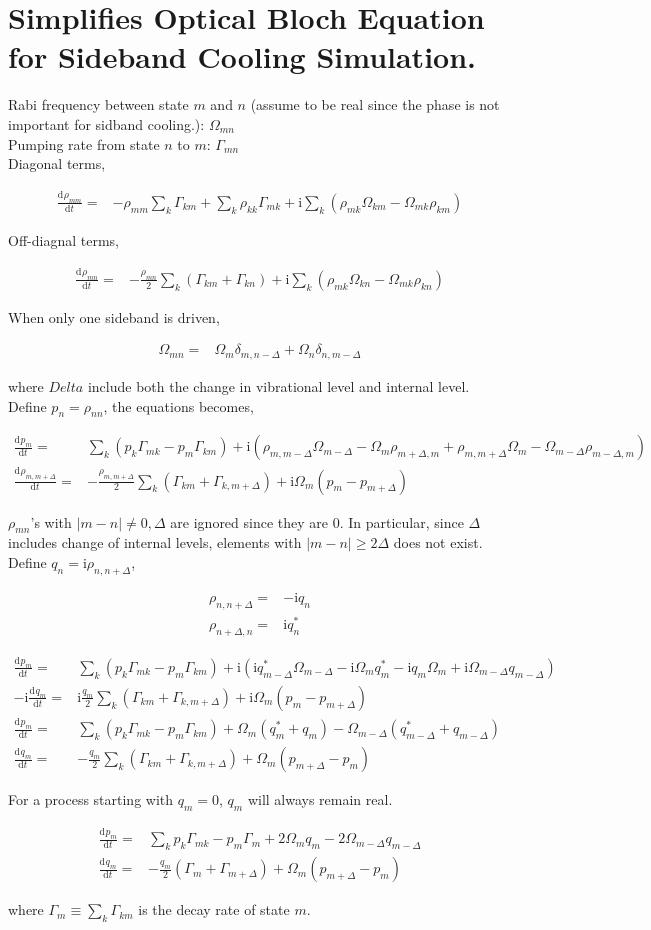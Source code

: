 \documentclass[10pt,fleqn]{article}
\newcommand{\ud}{\mathrm{d}}
\newcommand{\ui}{\mathrm{i}}
\newcommand{\eqar}[1]
{
  \begin{align*}
    #1
  \end{align*}
}
\newcommand{\paren}[1]{{\left({#1}\right)}}
\newcommand{\abs}[1]{{\left|{#1}\right|}}
\newcommand{\diff}[3][{}]{{\frac{\ud^{#1} {#2}}{\ud {#3}{}^{#1}}}}
\begin{document}
\section{Simplifies Optical Bloch Equation for Sideband Cooling Simulation.}
Rabi frequency between state $m$ and $n$ (assume to be real since the phase is not important for sidband cooling.): $\Omega_{mn}$\\
Pumping rate from state $n$ to $m$: $\Gamma_{mn}$\\

Diagonal terms,
\eqar{
  \diff{\rho_{mm}}{t}=&-\rho_{mm}\sum_k\Gamma_{km}+\sum_k\rho_{kk}\Gamma_{mk}+\ui\sum_k\paren{\rho_{mk}\Omega_{km}-\Omega_{mk}\rho_{km}}
}
Off-diagnal terms,
\eqar{
  \diff{\rho_{mn}}{t}=&-\frac{\rho_{mn}}{2}\sum_k\paren{\Gamma_{km}+\Gamma_{kn}}+\ui\sum_k\paren{\rho_{mk}\Omega_{kn}-\Omega_{mk}\rho_{kn}}
}

When only one sideband is driven,
\eqar{
  \Omega_{mn}=&\Omega_{m}\delta_{m,n-\Delta}+\Omega_{n}\delta_{n,m-\Delta}
}
where $Delta$ include both the change in vibrational level and internal level.\\
Define $p_n=\rho_{nn}$, the equations becomes,
\eqar{
  \diff{p_{m}}{t}=&\sum_k\paren{p_{k}\Gamma_{mk}-p_{m}\Gamma_{km}}+\ui\paren{\rho_{m,m-\Delta}\Omega_{m-\Delta}-\Omega_{m}\rho_{m+\Delta, m}+\rho_{m,m+\Delta}\Omega_{m}-\Omega_{m-\Delta}\rho_{m-\Delta,m}}\\
  \diff{\rho_{m,m+\Delta}}{t}=&-\frac{\rho_{m,m+\Delta}}{2}\sum_k\paren{\Gamma_{km}+\Gamma_{k,m+\Delta}}+\ui\Omega_{m}\paren{p_{m}-p_{m+\Delta}}
}
$\rho_{mn}$'s with $\abs{m-n}\neq0,\Delta$ are ignored since they are $0$. In particular, since $\Delta$ includes change of internal levels, elements with $\abs{m-n}\geqslant2\Delta$ does not exist.\\

Define $q_n=\ui\rho_{n,n+\Delta}$,
\eqar{
  \rho_{n,n+\Delta}=&-\ui q_n\\
  \rho_{n+\Delta,n}=&\ui q_n^*
}
\eqar{
  \diff{p_{m}}{t}=&\sum_k\paren{p_{k}\Gamma_{mk}-p_{m}\Gamma_{km}}+\ui\paren{\ui q_{m-\Delta}^*\Omega_{m-\Delta}-\ui\Omega_{m}q_{m}^*-\ui q_m\Omega_{m}+\ui\Omega_{m-\Delta}q_{m-\Delta}}\\
  -\ui\diff{q_m}{t}=&\ui\frac{q_{m}}{2}\sum_k\paren{\Gamma_{km}+\Gamma_{k,m+\Delta}}+\ui\Omega_{m}\paren{p_{m}-p_{m+\Delta}}\\
  \diff{p_{m}}{t}=&\sum_k\paren{p_{k}\Gamma_{mk}-p_{m}\Gamma_{km}}+\Omega_{m}\paren{q_{m}^*+q_m}-\Omega_{m-\Delta}\paren{q_{m-\Delta}^*+q_{m-\Delta}}\\
  \diff{q_m}{t}=&-\frac{q_{m}}{2}\sum_k\paren{\Gamma_{km}+\Gamma_{k,m+\Delta}}+\Omega_{m}\paren{p_{m+\Delta}-p_{m}}
}
For a process starting with $q_m=0$, $q_m$ will always remain real.
\eqar{
  \diff{p_{m}}{t}=&\sum_kp_{k}\Gamma_{mk}-p_{m}\Gamma_{m}+2\Omega_{m}q_m-2\Omega_{m-\Delta}q_{m-\Delta}\\
  \diff{q_m}{t}=&-\frac{q_{m}}{2}\paren{\Gamma_{m}+\Gamma_{m+\Delta}}+\Omega_{m}\paren{p_{m+\Delta}-p_{m}}
}
where $\Gamma_m\equiv\displaystyle\sum_k\Gamma_{km}$ is the decay rate of state $m$.\\
\end{document}
